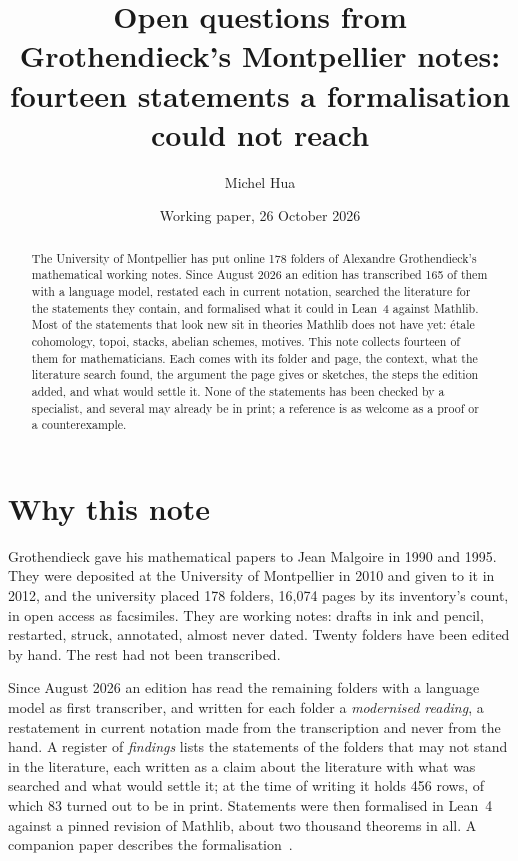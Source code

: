 \documentclass[11pt]{article}
\title{Open questions from Grothendieck's Montpellier notes:\\ fourteen statements a formalisation could not reach}
\author{Michel Hua}
\date{Working paper, 26 October 2026}
\theoremstyle{definition}
\theoremstyle{plain}\newtheorem*{proposition}{Proposition}\theoremstyle{definition}
\begin{document}
\maketitle

\begin{abstract}
The University of Montpellier has put online 178 folders of Alexandre Grothendieck's mathematical working notes. Since August 2026 an edition has transcribed 165 of them with a language model, restated each in current notation, searched the literature for the statements they contain, and formalised what it could in Lean~4 against Mathlib. Most of the statements that look new sit in theories Mathlib does not have yet: étale cohomology, topoi, stacks, abelian schemes, motives. This note collects fourteen of them for mathematicians. Each comes with its folder and page, the context, what the literature search found, the argument the page gives or sketches, the steps the edition added, and what would settle it. None of the statements has been checked by a specialist, and several may already be in print; a reference is as welcome as a proof or a counterexample.
\end{abstract}


\section{Why this note}

Grothendieck gave his mathematical papers to Jean Malgoire in 1990 and 1995. They were deposited at the University of Montpellier in 2010 and given to it in 2012, and the university placed 178 folders, 16,074 pages by its inventory's count, in open access as facsimiles. They are working notes: drafts in ink and pencil, restarted, struck, annotated, almost never dated. Twenty folders have been edited by hand. The rest had not been transcribed.

Since August 2026 an edition has read the remaining folders with a language model as first transcriber, and written for each folder a \emph{modernised reading}, a restatement in current notation made from the transcription and never from the hand. A register of \emph{findings} lists the statements of the folders that may not stand in the literature, each written as a claim about the literature with what was searched and what would settle it; at the time of writing it holds 456 rows, of which 83 turned out to be in print. Statements were then formalised in Lean~4 against a pinned revision of Mathlib, about two thousand theorems in all. A companion paper describes the formalisation~\cite{huacicm}.
\end{document}
